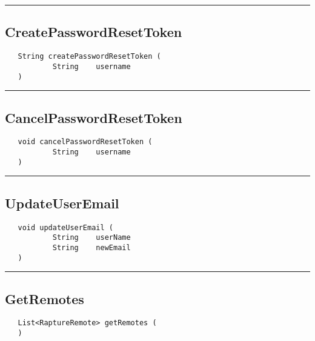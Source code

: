 \rule{15cm}{2pt}
\subsection{CreatePasswordResetToken}
\label{Api:CreatePasswordResetToken}
\begin{verbatim}
   String createPasswordResetToken (
           String    username
   )
\end{verbatim}



\rule{15cm}{2pt}
\subsection{CancelPasswordResetToken}
\label{Api:CancelPasswordResetToken}
\begin{verbatim}
   void cancelPasswordResetToken (
           String    username
   )
\end{verbatim}



\rule{15cm}{2pt}
\subsection{UpdateUserEmail}
\label{Api:UpdateUserEmail}
\begin{verbatim}
   void updateUserEmail (
           String    userName
           String    newEmail
   )
\end{verbatim}



\rule{15cm}{2pt}
\subsection{GetRemotes}
\label{Api:GetRemotes}
\begin{verbatim}
   List<RaptureRemote> getRemotes (
   )
\end{verbatim}



